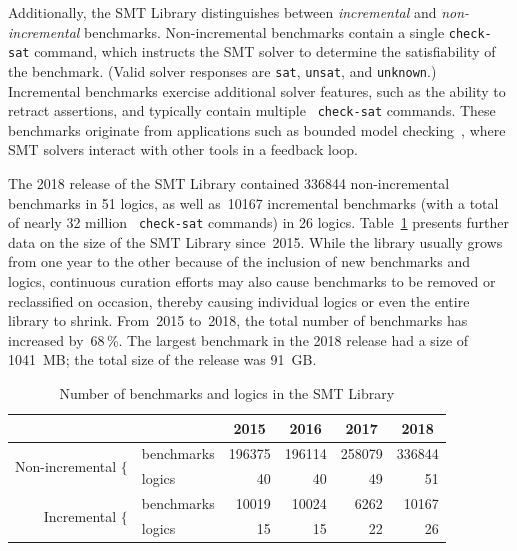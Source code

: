 \documentclass[dvipsnames,table,twoside,11pt]{article}
\begin{document}
Additionally, the SMT Library distinguishes between \emph{incremental}
and \emph{non-incremental} benchmarks.  Non-incremental benchmarks
contain a single {\tt check-sat} command, which instructs the SMT
solver to determine the satisfiability of the benchmark.  (Valid
solver responses are {\tt sat}, {\tt unsat}, and {\tt unknown}.)
Incremental benchmarks exercise additional solver features, such as
the ability to retract assertions, and typically contain multiple {\tt
  check-sat} commands.  These benchmarks originate from applications
such as bounded model
checking~\cite{Gunther:2014:IBS:2632362.2632374}, where SMT solvers
interact with other tools in a feedback loop.

The 2018 release of the SMT Library contained \num{336844}
non-incremental benchmarks in 51 logics, as well as~\num{10167}
incremental benchmarks (with a total of nearly 32 million {\tt
  check-sat} commands) in 26 logics.  Table~\ref{table:smtlib}
presents further data on the size of the SMT Library since~2015.
While the library usually grows from one year to the other because of
the inclusion of new benchmarks and logics, continuous curation
efforts may also cause benchmarks to be removed or reclassified on
occasion, thereby causing individual logics or even the entire library
to shrink.  From~2015 to~2018, the total number of benchmarks has
increased by~68\,\%.  The largest benchmark in the 2018 release had a
size of \SI{1041}{MB}; the total size of the release was \SI{91}{GB}.

\begin{table}
  \caption{Number of benchmarks and logics in the SMT Library}
  \label{table:smtlib}
  \centering
  \begin{tabular}{r@{\ \ }lrrrr}
    \toprule
                               & & \multicolumn{1}{c}{2015} & \multicolumn{1}{c}{2016} & \multicolumn{1}{c}{2017} & \multicolumn{1}{c}{2018} \\
    \midrule
    \multirow{2}{*}{Non-incremental $\{$} & benchmarks & 196375 & 196114 & 258079 & 336844 \\
                                          & logics     &     40 &     40 &     49 &     51 \\
    \multirow{2}{*}{Incremental $\{$}     & benchmarks &  10019 &  10024 &   6262 &  10167 \\
                                          & logics     &     15 &     15 &     22 &     26 \\
    \bottomrule
  \end{tabular}
\end{table}
\end{document}
